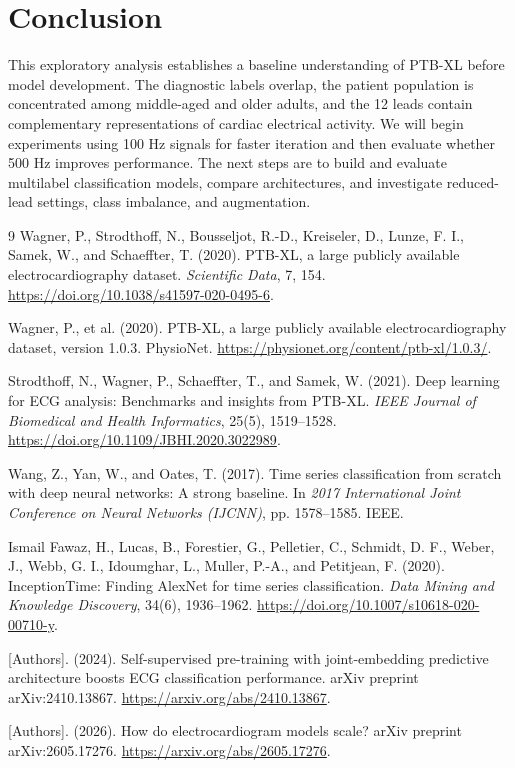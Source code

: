 \documentclass{article}
\begin{document}
\section{Conclusion}

This exploratory analysis establishes a baseline understanding of PTB-XL before model development. The diagnostic labels overlap, the patient population is concentrated among middle-aged and older adults, and the 12 leads contain complementary representations of cardiac electrical activity. We will begin experiments using 100 Hz signals for faster iteration and then evaluate whether 500 Hz improves performance. The next steps are to build and evaluate multilabel classification models, compare architectures, and investigate reduced-lead settings, class imbalance, and augmentation.

\clearpage
\begin{thebibliography}{9}
\small
{}
Wagner, P., Strodthoff, N., Bousseljot, R.-D., Kreiseler, D., Lunze, F. I., Samek, W., and Schaeffter, T. (2020). PTB-XL, a large publicly available electrocardiography dataset. \emph{Scientific Data}, 7, 154. \url{https://doi.org/10.1038/s41597-020-0495-6}.

Wagner, P., et al. (2020). PTB-XL, a large publicly available electrocardiography dataset, version 1.0.3. PhysioNet. \url{https://physionet.org/content/ptb-xl/1.0.3/}.

Strodthoff, N., Wagner, P., Schaeffter, T., and Samek, W. (2021). Deep learning for ECG analysis: Benchmarks and insights from PTB-XL. \emph{IEEE Journal of Biomedical and Health Informatics}, 25(5), 1519--1528. \url{https://doi.org/10.1109/JBHI.2020.3022989}.

Wang, Z., Yan, W., and Oates, T. (2017). Time series classification from scratch with deep neural networks: A strong baseline. In \emph{2017 International Joint Conference on Neural Networks (IJCNN)}, pp. 1578--1585. IEEE.

Ismail Fawaz, H., Lucas, B., Forestier, G., Pelletier, C., Schmidt, D. F., Weber, J., Webb, G. I., Idoumghar, L., Muller, P.-A., and Petitjean, F. (2020). InceptionTime: Finding AlexNet for time series classification. \emph{Data Mining and Knowledge Discovery}, 34(6), 1936--1962. \url{https://doi.org/10.1007/s10618-020-00710-y}.

[Authors]. (2024). Self-supervised pre-training with joint-embedding predictive architecture boosts ECG classification performance. arXiv preprint arXiv:2410.13867. \url{https://arxiv.org/abs/2410.13867}.

[Authors]. (2026). How do electrocardiogram models scale? arXiv preprint arXiv:2605.17276. \url{https://arxiv.org/abs/2605.17276}.
\end{thebibliography}
\end{document}
